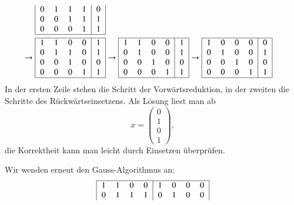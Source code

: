\begin{loesung}
\begin{teilaufgaben}
\begin{align*}
\begin{tabular}{|>{$}c<{$}>{$}c<{$}>{$}c<{$}>{$}c<{$}|>{$}c<{$}|}
   0 & 1 & 1 & 1 &  0\\
   0 & 0 & 1 & 1 &  1\\
   0 & 0 & 0 & 1 &  1\\
\hline
\end{tabular}
\\
\to
\begin{tabular}{|>{$}c<{$}>{$}c<{$}>{$}c<{$}>{$}c<{$}|>{$}c<{$}|}
\hline
   1 & 1 & 0 & 0 &  1\\
   0 & 1 & 1 & 0 &  1\\
   0 & 0 & 1 & 0 &  0\\
   0 & 0 & 0 & 1 &  1\\
\hline
\end{tabular}
&
\to
\begin{tabular}{|>{$}c<{$}>{$}c<{$}>{$}c<{$}>{$}c<{$}|>{$}c<{$}|}
\hline
   1 & 1 & 0 & 0 &  1\\
   0 & 1 & 0 & 0 &  1\\
   0 & 0 & 1 & 0 &  0\\
   0 & 0 & 0 & 1 &  1\\
\hline
\end{tabular}
\to
\begin{tabular}{|>{$}c<{$}>{$}c<{$}>{$}c<{$}>{$}c<{$}|>{$}c<{$}|}
\hline
   1 & 0 & 0 & 0 &  0\\
   0 & 1 & 0 & 0 &  1\\
   0 & 0 & 1 & 0 &  0\\
   0 & 0 & 0 & 1 &  1\\
\hline
\end{tabular}
\end{align*}
In der ersten Zeile stehen die Schritt der Vorwärtsreduktion, in der
zweiten die Schritte des Rückwärtseinsetzens.
Als Lösung liest man ab
\[
x=\begin{pmatrix}0\\1\\0\\1 \end{pmatrix},
\]
die Korrektheit kann man leicht durch Einsetzen überprüfen.
\item
Wir wenden erneut den Gauss-Algorithmus an:
\begin{align*}
\begin{tabular}{|>{$}c<{$}>{$}c<{$}>{$}c<{$}>{$}c<{$}|>{$}c<{$}>{$}c<{$}>{$}c<{$}>{$}c<{$}|}
\hline
   1 & 1 & 0 & 0 &  1 & 0 & 0 & 0 \\
   0 & 1 & 1 & 1 &  0 & 1 & 0 & 0 \\

\end{tabular}
\end{align*}
\end{teilaufgaben}
\end{loesung}
